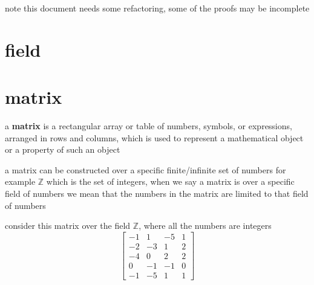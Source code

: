 \documentclass[a4paper,12pt]{article}
\begin{document}
\newenvironment{note}
  {\begin{bclogo}[logo=\bcinfo, couleurBarre=orange, couleur=lightgray]{ note}}
  {\end{bclogo}}
\newenvironment{attention}
  {\begin{bclogo}[logo=\bcattention, couleurBarre=red, noborder=true, 
                couleur=red!15]{Important!}}
  {\end{bclogo}}

\begin{note}
this document needs some refactoring, some of the proofs may be incomplete\\
\end{note}

\section{field}
\label{sec:orgd95c18e}
\section{matrix}
\label{sec:org2833a15}
\begin{definition}
a \textbf{matrix} is a rectangular array or table of numbers, symbols, or expressions, arranged in rows and columns, which is used to represent a mathematical object or a property of such an object\\
\begin{characteristic}
a matrix can be constructed over a specific finite/infinite set of numbers for example \(\mathbb{Z}\) which is the set of integers, when we say a matrix is over a specific field of numbers we mean that the numbers in the matrix are limited to that field of numbers\\
\end{characteristic}
\begin{my_example}
consider this matrix over the field \(\mathbb{Z}\), where all the numbers are integers\\
\[\left[\begin{array}{rrrr} -1 & 1 & -5 & 1 \\ -2 & -3 & 1 & 2 \\ -4 & 0 & 2 & 2 \\ 0 & -1 & -1 & 0 \\ -1 & -5 & 1 & 1 \end{array}\right]\]\\
\end{my_example}
\end{definition}
\end{document}
